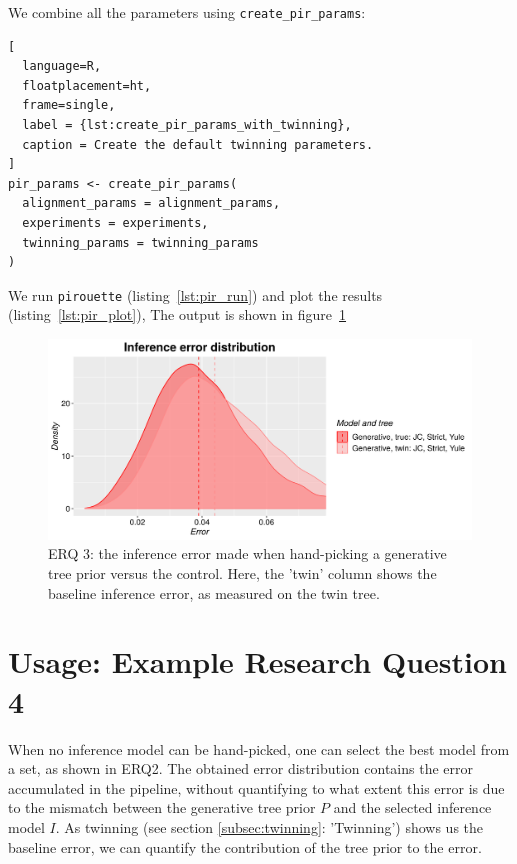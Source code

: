 \documentclass{article}
\begin{document}
We combine all the parameters using \verb;create_pir_params;:

\begin{lstlisting}[
  language=R, 
  floatplacement=ht, 
  frame=single,
  label = {lst:create_pir_params_with_twinning},
  caption = Create the default twinning parameters.
]
pir_params <- create_pir_params(
  alignment_params = alignment_params,
  experiments = experiments,
  twinning_params = twinning_params
)
\end{lstlisting}

We run \verb;pirouette; (listing~\ref{lst:pir_run}) 
and plot the results (listing~\ref{lst:pir_plot}),
The output is shown in figure~\ref{fig:example_3}

\begin{figure}[H]
  \includegraphics[width=\textwidth]{example_3/errors.png}
  \caption{
    ERQ 3: the inference error made 
    when hand-picking a generative tree prior versus the control.
    Here, the 'twin' column shows the baseline inference error,
    as measured on the twin tree.
  }
  \label{fig:example_3}
\end{figure}

\section{Usage: Example Research Question 4}

When no inference model can be hand-picked, 
one can select the best model from a set,
as shown in ERQ2.
The obtained error distribution contains the error accumulated in the pipeline,
without quantifying to what extent this error is due to the mismatch between 
the generative tree prior $\mathit{P}$ and the selected inference model 
$\mathit{I}$.
As twinning (see section \ref{subsec:twinning}: 'Twinning') shows us the baseline error,
we can quantify the contribution of the tree prior to the error.
\end{document}
